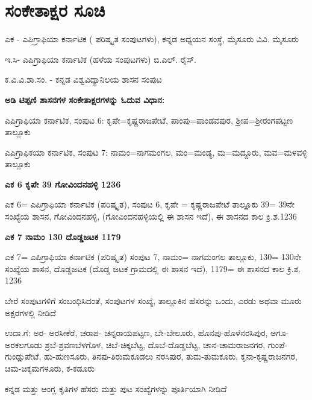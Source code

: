 
\chapter*{ಸಂಕೇತಾಕ್ಷರ ಸೂಚಿ}

\noindent
ಎಕ - ಎಪಿಗ್ರಾಫಿಯಾ ಕರ್ನಾಟಿಕ ( ಪರಿಷ್ಕೃತ ಸಂಪುಟಗಳು), ಕನ್ನಡ ಅಧ್ಯಯನ ಸಂಸ್ಥೆ, ಮೈಸೂರು ವಿವಿ. ಮೈಸೂರು

\noindent
ಇ.ಸಿ- ಎಪಿಗ್ರಾಫಿಯಾ ಕರ್ನಾಟಿಕ (ಹಳೆಯ ಸಂಪುಟಗಳು) ಬಿ.ಎಲ್​. ರೈಸ್​.

\noindent
ಕ.ವಿ.ವಿ.ಶಾ.ಸಂ. - ಕನ್ನಡ ವಿಶ್ವವಿದ್ಯಾನಿಲಯ ಶಾಸನ ಸಂಪುಟ

\noindent
\textbf{ಅಡಿ ಟಿಪ್ಪಣಿ ಶಾಸನಗಳ ಸಂಕೇತಾಕ್ಷರಗಳನ್ನು ಓದುವ ವಿಧಾನ:}

\noindent
ಎಪಿಗ್ರಾಫಿಯಾ ಕರ್ನಾಟಿಕ, ಸಂಪುಟ 6: ಕೃಪೇ=ಕೃಷ್ಣರಾಜಪೇಟೆ, ಪಾಂಪು=ಪಾಂಡವಪುರ, ಶ‍್ರೀಪ=ಶ‍್ರೀರಂಗಪಟ್ಟಣ ತಾಲ್ಲೂಕು

\noindent
ಎಪಿಗ್ರಾಫಿಕಯಾ ಕರ್ನಾಟಿಕ, ಸಂಪುಟ 7: ನಾಮಂ=ನಾಗಮಂಗಲ, ಮಂ=ಮಂಡ್ಯ, ಮ=ಮದ್ದೂರು, ಮವ=ಮಳವಳ್ಳಿ ತಾಲ್ಲೂಕು

\noindent
\textbf{ಎಕ 6 ಕೃಪೇ 39 ಗೋವಿಂದನಹಳ್ಳಿ 1236}

\noindent
ಎಕ 6= ಎಪಿಗ್ರಾಫಿಯಾ ಕರ್ನಾಟಿಕ (ಪರಿಷ್ಕೃತ), ಸಂಪುಟ 6, ಕೃಪೇ = ಕೃಷ್ಣರಾಜಪೇಟೆ ತಾಲ್ಲೂಕು 39= 39ನೇ ಸಂಖ್ಯೆಯ ಶಾಸನ, ಗೋವಿಂದನಹಳ್ಳಿ, (ಗೋವಿಂದನಹಳ್ಳಿಯಲ್ಲಿ ಈ ಶಾಸನ ಇದೆ), ಈ ಶಾಸನದ ಕಾಲ ಕ್ರಿ.ಶ.1236

\noindent
\textbf{ಎಕ 7 ನಾಮಂ 130 ದೊಡ್ಡಜಟಕ 1179}

\noindent
ಎಕ 7= ಎಪಿಗ್ರಾಫಿಯಾ ಕರ್ನಾಟಿಕ (ಪರಿಷ್ಕೃತ) ಸಂಪುಟ 7, ನಾಮಂ= ನಾಗಮಂಗಲ ತಾಲ್ಲೂಕು, 130= 130ನೇ ಸಂಖ್ಯೆಯ ಶಾಸನ, ದೊಡ್ಡಜಟಕ (ದೊಡ್ಡ ಜಟಕ ಗ್ರಾಮದಲ್ಲಿ ಈ ಶಾಸನ ಇದೆ), 1179= ಈ ಶಾಸನದ ಕಾಲ ಕ್ರಿ.ಶ. 1236

\noindent
ಬೇರೆ ಸಂಪುಟಗಳಿಗೆ ಸಂಬಂಧಿಸಿದಂತೆ, ಸಂಪುಟಗಳ ಸಂಖ್ಯೆ, ತಾಲ್ಲೂಕಿನ ಹೆಸರನ್ನು ಒಂದು, ಎರಡು ಅಥವಾ ಮೂರು ಅಕ್ಷರಗಳಲ್ಲಿ ನೀಡಿದೆ

\noindent
ಉದಾ.ಗೆ: ಅರ- ಅರಸೀಕೆರೆ, ಚರಾಪ- ಚನ್ನರಾಯಪಟ್ಟಣ, ಬೇ-ಬೇಲೂರು, ಹೊನಪು-ಹೊಳೆನರಸಿಪುರ, ಅಗೂ-ಅರಕಲಗೂಡು ಶ್ರಬೆ-ಶ್ರವಣಬೆಳಗೊಳ, ಚಿಬೆ-ಚಿಕ್ಕಬೆಟ್ಟ, ದೊಬೆ-ದೊಡ್ಡಬೆಟ್ಟ, ಚಾನ-ಚಾಮರಾಜನಗರ, ಗುಂಪೆ-ಗುಂಡ್ಲುಪೇಟೆ, ಹು-ಹುಣಸೂರು, ತಿನಪು-ತಿರುಮಕೂಡಲು ನರಸಿಪುರ, ತುಮ-ತುಮಕೂರು, ಕೃನಾ-ಕೃಷ್ಣರಾಜನಗರ, ಚಿಮ-ಚಿಕ್ಕಮಗಳೂರು, ಕ-ಕಡೂರು

\noindent
ಕನ್ನಡ ಮತ್ತು ಆಂಗ್ಲ ಕೃತಿಗಳ ಹೆಸರು ಮತ್ತು ಪುಟ ಸಂಖ್ಯೆಗಳನ್ನು ಪೂರ್ತಿಯಾಗಿ ನೀಡಿದೆ

